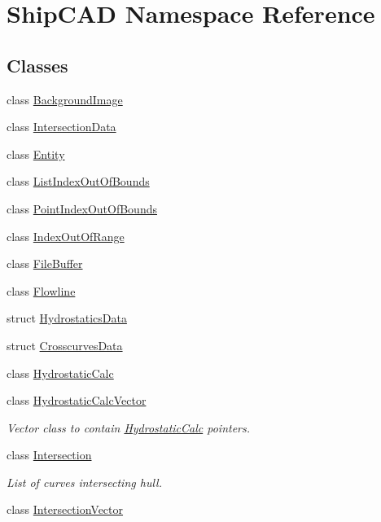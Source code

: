 \hypertarget{namespaceShipCAD}{\section{Ship\-C\-A\-D Namespace Reference}
\label{namespaceShipCAD}
}
\subsection*{Classes}
\begin{DoxyCompactItemize}
\item 
class \hyperlink{classShipCAD_1_1BackgroundImage}{Background\-Image}
\item 
class \hyperlink{classShipCAD_1_1IntersectionData}{Intersection\-Data}
\item 
class \hyperlink{classShipCAD_1_1Entity}{Entity}
\item 
class \hyperlink{classShipCAD_1_1ListIndexOutOfBounds}{List\-Index\-Out\-Of\-Bounds}
\item 
class \hyperlink{classShipCAD_1_1PointIndexOutOfBounds}{Point\-Index\-Out\-Of\-Bounds}
\item 
class \hyperlink{classShipCAD_1_1IndexOutOfRange}{Index\-Out\-Of\-Range}
\item 
class \hyperlink{classShipCAD_1_1FileBuffer}{File\-Buffer}
\item 
class \hyperlink{classShipCAD_1_1Flowline}{Flowline}
\item 
struct \hyperlink{structShipCAD_1_1HydrostaticsData}{Hydrostatics\-Data}
\item 
struct \hyperlink{structShipCAD_1_1CrosscurvesData}{Crosscurves\-Data}
\item 
class \hyperlink{classShipCAD_1_1HydrostaticCalc}{Hydrostatic\-Calc}
\item 
class \hyperlink{classShipCAD_1_1HydrostaticCalcVector}{Hydrostatic\-Calc\-Vector}
\begin{DoxyCompactList}\small\item\em Vector class to contain \hyperlink{classShipCAD_1_1HydrostaticCalc}{Hydrostatic\-Calc} pointers. \end{DoxyCompactList}\item 
class \hyperlink{classShipCAD_1_1Intersection}{Intersection}
\begin{DoxyCompactList}\small\item\em List of curves intersecting hull. \end{DoxyCompactList}\item 
class \hyperlink{classShipCAD_1_1IntersectionVector}{Intersection\-Vector}

\end{DoxyCompactItemize}
